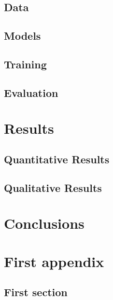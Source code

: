 \documentclass[logo,bsc,singlespacing,parskip,online]{infthesis}
\begin{document}
\section{Data}

\section{Models}

\section{Training}

\section{Evaluation}

\chapter{Results}

\section{Quantitative Results}

\section{Qualitative Results}


\chapter{Conclusions}



% 



\appendix

\chapter{First appendix}

\section{First section}
\end{document}

